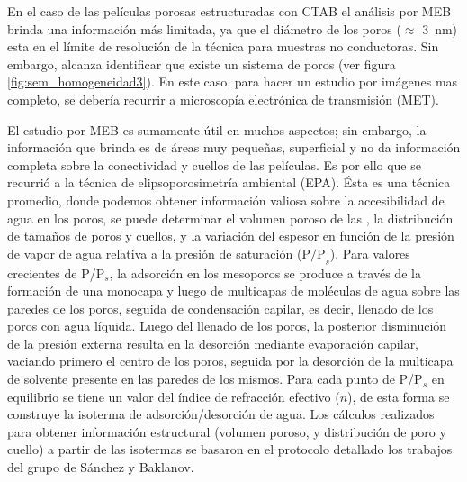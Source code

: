 		 En el caso de las películas porosas estructuradas con CTAB el análisis por MEB brinda una información más limitada, ya que el diámetro de los poros ($\approx$ \SI{3}{\nm}) esta en el límite de resolución de la técnica para muestras no conductoras. Sin embargo, alcanza identificar que existe un sistema de poros (ver figura \ref{fig:sem_homogeneidad3}). En este caso, para hacer un estudio por imágenes mas completo, se debería recurrir a microscopía electrónica de transmisión (MET).

		 El estudio por MEB es sumamente útil en muchos aspectos; sin embargo, la información que brinda es de áreas muy pequeñas, superficial y no da información completa sobre la conectividad y cuellos de las películas. Es por ello que se recurrió a la técnica de elipsoporosimetría ambiental (EPA). Ésta es una técnica promedio, donde podemos obtener información valiosa sobre la accesibilidad de agua en los poros, se puede determinar el volumen poroso de las \pdm, la distribución de tamaños de poros y cuellos, y la variación del espesor en función de la presión de vapor de agua relativa a la presión de saturación ($\text{P/P}_s$). Para valores crecientes de P/P$_s$, la adsorción en los mesoporos se produce a través de la formación de una monocapa y luego de multicapas de moléculas de agua sobre las paredes de los poros, seguida de condensación capilar, es decir, llenado de los poros con agua líquida. Luego del llenado de los poros, la posterior disminución de la presión externa resulta en la desorción mediante evaporación capilar, vaciando primero el centro de los poros, seguida por la desorción de la multicapa de solvente presente en las paredes de los mismos. Para cada punto de P/P$_s$ en equilibrio se tiene un valor del índice de refracción efectivo ($n$), de esta forma se construye la isoterma de adsorción/desorción de agua. Los cálculos realizados para obtener información estructural (volumen poroso, y distribución de poro y cuello) a partir de las isotermas se basaron en el protocolo detallado los trabajos del grupo de Sánchez y Baklanov\cite{Baklanov2000,Boissiere2005,Sakatani2006}. 

